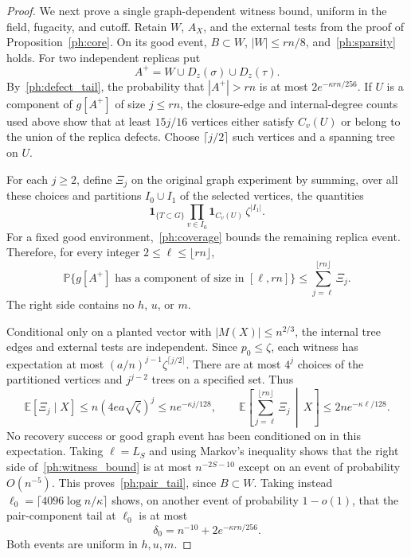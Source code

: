 \documentclass[11pt]{article}
\def\P{\mathbb{P}}
\def\E{\mathbb{E}}
\numberwithin{equation}{section}
\begin{document}
\begin{proof}
We next prove a single graph-dependent witness bound, uniform in the field, fugacity, and cutoff. Retain $W$, $A_X$, and the external tests from the proof of Proposition~\ref{ph:core}. On its good event, $B\subset W$, $|W|\le rn/8$, and~\eqref{ph:sparsity} holds. For two independent replicas put
\[
    A^+=W\cup D_z(\sigma)\cup D_z(\tau).
\]
By~\eqref{ph:defect_tail}, the probability that $|A^+|>rn$ is at most $2e^{-\kappa rn/256}$. If $U$ is a component of $g[A^+]$ of size $j\le rn$, the closure-edge and internal-degree counts used above show that at least $15j/16$ vertices either satisfy $C_v(U)$ or belong to the union of the replica defects. Choose $\lceil j/2\rceil$ such vertices and a spanning tree on $U$.

For each $j\ge2$, define $\Xi_j$ on the original graph experiment by summing, over all these choices and partitions $I_0\cup I_1$ of the selected vertices, the quantities
\[
    \mathbf1_{\{T\subset G\}}
       \prod_{v\in I_0}\mathbf1_{C_v(U)}\,\zeta^{|I_1|}.
\]
For a fixed good environment,~\eqref{ph:coverage} bounds the remaining replica event. Therefore, for every integer $2\le\ell\le\lfloor rn\rfloor$,
\begin{equation}\label{ph:witness_bound}
 \P\{g[A^+]\text{ has a component of size in }[\ell,rn]\}
       \le\sum_{j=\ell}^{\lfloor rn\rfloor}\Xi_j.
\end{equation}
The right side contains no $h$, $u$, or $m$.

Conditional only on a planted vector with $|M(X)|\le n^{2/3}$, the internal tree edges and external tests are independent. Since $p_0\le\zeta$, each witness has expectation at most $(a/n)^{j-1}\zeta^{\lceil j/2\rceil}$. There are at most $4^j$ choices of the partitioned vertices and $j^{j-2}$ trees on a specified set. Thus
\begin{equation}\label{ph:witness_mean}
 \E[\Xi_j\mid X]\le n(4ea\sqrt\zeta)^j
       \le ne^{-\kappa j/128},
 \qquad
 \E\left[\sum_{j=\ell}^{\lfloor rn\rfloor}\Xi_j\,\middle|\,X\right]
       \le2ne^{-\kappa\ell/128}.
\end{equation}
No recovery success or good graph event has been conditioned on in this expectation. Taking $\ell=L_S$ and using Markov's inequality shows that the right side of~\eqref{ph:witness_bound} is at most $n^{-2S-10}$ except on an event of probability $O(n^{-5})$. This proves~\eqref{ph:pair_tail}, since $B\subset W$. Taking instead
$\ell_0=\lceil4096\log n/\kappa\rceil$ shows, on another event of probability $1-o(1)$, that the pair-component tail at $\ell_0$ is at most
\[
    \delta_0=n^{-10}+2e^{-\kappa rn/256}.
\]
Both events are uniform in $h,u,m$.


\end{proof}
\end{document}
